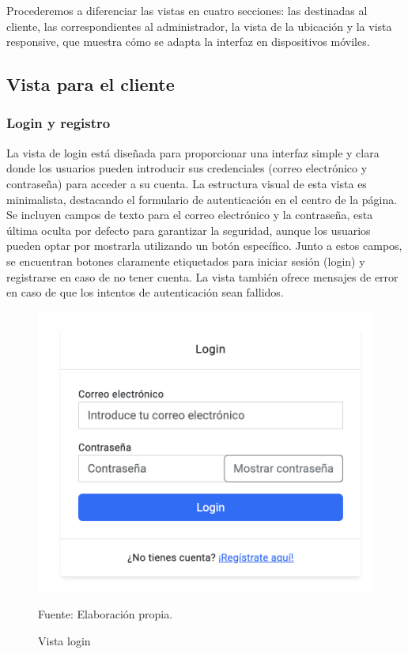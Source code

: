 \vspace{0.5cm}
Procederemos a diferenciar las vistas en cuatro secciones: las destinadas al cliente, las correspondientes al administrador, la vista de la ubicación y la vista responsive, que muestra cómo se adapta la interfaz en dispositivos móviles.

\subsection{Vista para el cliente}\label{subsec5.1.1}

\subsubsection{Login y registro}\label{subsec5.1.1.1}


La vista de login está diseñada para proporcionar una interfaz simple y clara donde los usuarios pueden introducir sus credenciales (correo electrónico y contraseña) para acceder a su cuenta. La estructura visual de esta vista es minimalista, destacando el formulario de autenticación en el centro de la página. Se incluyen campos de texto para el correo electrónico y la contraseña, esta última oculta por defecto para garantizar la seguridad, aunque los usuarios pueden optar por mostrarla utilizando un botón específico. Junto a estos campos, se encuentran botones claramente etiquetados para iniciar sesión (login) y registrarse en caso de no tener cuenta. La vista también ofrece mensajes de error en caso de que los intentos de autenticación sean fallidos.

\begin{figure}[H]
\begin{center}
\includegraphics[scale=0.5]{./Images/vista_login.png}
\caption{Vista login} Fuente: Elaboración propia.

\label{fig:fig1}

\end{center}
\end{figure}

